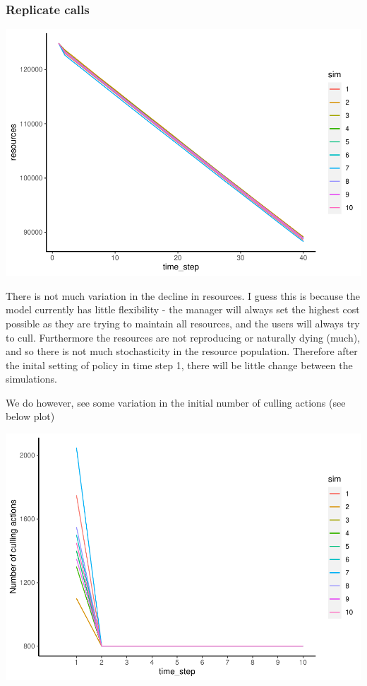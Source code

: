 \documentclass[
]{article}
\begin{document}
\hypertarget{replicate-calls-1}{%
\subsubsection{Replicate calls}\label{replicate-calls-1}}

\includegraphics{gmse_tenure_ongoing_files/figure-latex/ten_rep_4_plot_resources-1.pdf}

There is not much variation in the decline in resources. I guess this is
because the model currently has little flexibility - the manager will
always set the highest cost possible as they are trying to maintain all
resources, and the users will always try to cull. Furthermore the
resources are not reproducing or naturally dying (much), and so there is
not much stochasticity in the resource population. Therefore after the
inital setting of policy in time step 1, there will be little change
between the simulations.

We do however, see some variation in the initial number of culling
actions (see below plot)

\includegraphics{gmse_tenure_ongoing_files/figure-latex/ten_rep_4_plot_actions-1.pdf}
\end{document}
